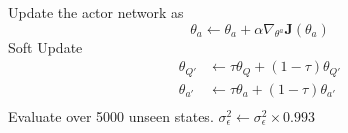 \begin{samepage}
\begin{algorithm}
\begin{algorithmic}
                \State Update the actor network as \[ \theta_a \gets \theta_a + \alpha \nabla_{\theta^a} \mathbf{J}(\theta_a) \]
                \State Soft Update
                \begin{equation}
                    \begin{aligned}
                        \theta_{Q'} & \gets \tau \theta_Q + (1 - \tau) \theta_{Q'} \\
                        \theta_{a'} & \gets \tau \theta_a + (1 - \tau) \theta_{a'} \\
                    \end{aligned}
                \end{equation} 
                \State Evaluate over 5000 unseen states. 
            \EndFor
            \State $\sigma^2_\epsilon \gets \sigma^2_\epsilon \times 0.993$
        \EndFor
    \end{algorithmic}
\end{algorithm}
\end{samepage}
